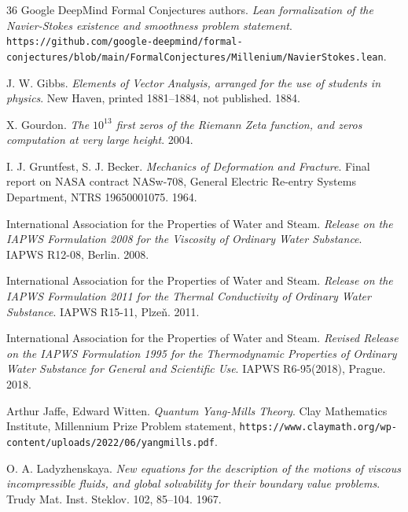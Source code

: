 \begin{thebibliography}{36}
Google DeepMind Formal Conjectures authors. \emph{Lean formalization of the Navier-Stokes existence and smoothness problem statement}. \texttt{https:/\allowbreak{}/\allowbreak{}github.com/\allowbreak{}google-deepmind/\allowbreak{}formal-conjectures/\allowbreak{}blob/\allowbreak{}main/\allowbreak{}FormalConjectures/\allowbreak{}Millenium/\allowbreak{}NavierStokes.lean}.

J. W. Gibbs. \emph{Elements of Vector Analysis, arranged for the use of students in physics}. New Haven, printed 1881--1884, not published. 1884.

X. Gourdon. \emph{The $10^{13}$ first zeros of the Riemann Zeta function, and zeros computation at very large height}. 2004.

I. J. Gruntfest, S. J. Becker. \emph{Mechanics of Deformation and Fracture}. Final report on NASA contract NASw-708, General Electric Re-entry Systems Department, NTRS 19650001075. 1964.

International Association for the Properties of Water and Steam. \emph{Release on the IAPWS Formulation 2008 for the Viscosity of Ordinary Water Substance}. IAPWS R12-08, Berlin. 2008.

International Association for the Properties of Water and Steam. \emph{Release on the IAPWS Formulation 2011 for the Thermal Conductivity of Ordinary Water Substance}. IAPWS R15-11, Plze\v{n}. 2011.

International Association for the Properties of Water and Steam. \emph{Revised Release on the IAPWS Formulation 1995 for the Thermodynamic Properties of Ordinary Water Substance for General and Scientific Use}. IAPWS R6-95(2018), Prague. 2018.

Arthur Jaffe, Edward Witten. \emph{Quantum Yang-Mills Theory}. Clay Mathematics Institute, Millennium Prize Problem statement, \texttt{https:/\allowbreak{}/\allowbreak{}www.claymath.org/\allowbreak{}wp-content/\allowbreak{}uploads/\allowbreak{}2022/\allowbreak{}06/\allowbreak{}yangmills.pdf}.

O. A. Ladyzhenskaya. \emph{New equations for the description of the motions of viscous incompressible fluids, and global solvability for their boundary value problems}. Trudy Mat. Inst. Steklov. 102, 85--104. 1967.


\end{thebibliography}
